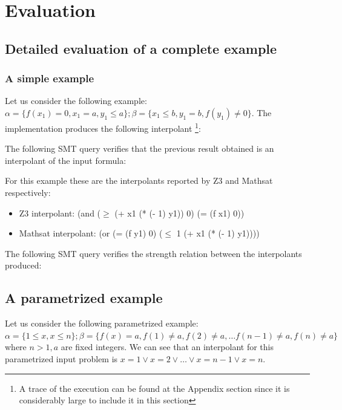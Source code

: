 \section{Evaluation}

\subsection{Detailed evaluation of a complete example}

\subsubsection{A simple example}

Let us consider the following example: 
$\alpha = \{ f(x_1) = 0, x_1 = a, y_1 \leq a\}; 
\beta = \{x_1 \leq b, y_1 = b, f(y_1) \neq 0\}$.
The implementation produces the following interpolant \footnote{A trace of the
  execution can be found at the Appendix section since it is considerably
large to include it in this section}: 



The following SMT query verifies that the previous result obtained is 
an interpolant of the input formula:



For this example these are the interpolants reported by Z3 and Mathsat
respectively:

\begin{itemize}
  \item Z3 interpolant: (and ($\geq$ (+ x1 (* (- 1) y1)) 0) (= (f x1) 0))
  \item Mathsat interpolant: (or (= (f y1) 0) ($\leq$ 1 (+ x1 (* (- 1) y1))))
\end{itemize}

The following SMT query verifies the strength relation between the interpolants produced:




\subsection{A parametrized example}

Let us consider the following parametrized 
example: $\alpha = \{1 \leq x, x \leq n \}; \beta = \{f(x) = a, 
  f(1) \neq a,
  f(2) \neq a, \dots
  f(n-1) \neq a,
f(n) \neq a\}$ where $n > 1, a$ are fixed integers. We can see that an 
interpolant for this parametrized input problem is 
$x = 1 \lor x = 2 \lor \dots \lor x = n-1 \lor x = n$.

